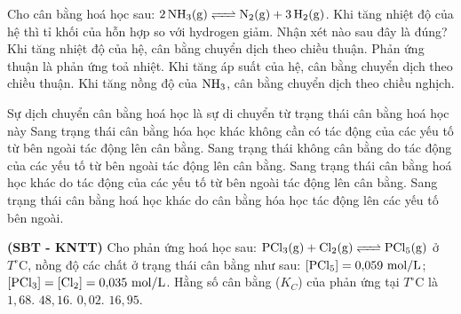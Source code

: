 \documentclass[12pt,a4paper]{article}
\begin{document}
\begin{ex}
Cho cân bằng hoá học sau: $\ce{2NH3(g) <=> N2(g) + 3H2(g)}$. Khi tăng nhiệt độ của hệ thì tỉ khối của hỗn hợp so với hydrogen giảm. Nhận xét nào sau đây là đúng?
\choice
{\True Khi tăng nhiệt độ của hệ, cân bằng chuyển dịch theo chiều thuận.}
{Phản ứng thuận là phản ứng toả nhiệt.}
{Khi tăng áp suất của hệ, cân bằng chuyển dịch theo chiều thuận.}
{Khi tăng nồng độ của $\ce{NH3}$, cân bằng chuyển dịch theo chiều nghịch.}
\end{ex}

\begin{ex}
Sự dịch chuyển cân bằng hoá học là sự di chuyển từ trạng thái cân bằng hoá học này
\choice
{Sang trạng thái cân bằng hóa học khác không cần có tác động của các yếu tố từ bên ngoài tác động lên cân bằng.}
{Sang trạng thái không cân bằng do tác động của các yếu tố từ bên ngoài tác động lên cân bằng.}
{\True Sang trạng thái cân bằng hoá học khác do tác động của các yếu tố từ bên ngoài tác động lên cân bằng.}
{Sang trạng thái cân bằng hoá học khác do cân bằng hóa học tác động lên các yếu tố bên ngoài.}
\end{ex}

\begin{ex}
\textbf{(SBT - KNTT)} Cho phản ứng hoá học sau: $\ce{PCl3(g) + Cl2(g) <=> PCl5(g)}$ ở $T^\circ\text{C}$, nồng độ các chất ở trạng thái cân bằng như sau: $[\ce{PCl5}] = 0{,}059\text{ mol/L}$; $[\ce{PCl3}] = [\ce{Cl2}] = 0{,}035\text{ mol/L}$. Hằng số cân bằng ($K_C$) của phản ứng tại $T^\circ\text{C}$ là
\choice
{$1{,}68.$}
{\True $48{,}16.$}
{$0{,}02.$}
{$16{,}95.$}
\end{ex}
\end{document}
